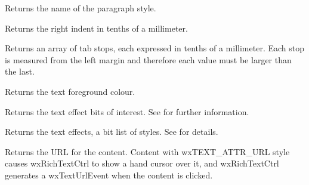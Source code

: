 \label{wxrichtextattrgetparagraphstylename}


Returns the name of the paragraph style.

\label{wxrichtextattrgetrightindent}


Returns the right indent in tenths of a millimeter.

\label{wxrichtextattrgettabs}


Returns an array of tab stops, each expressed in tenths of a millimeter. Each stop
is measured from the left margin and therefore each value must be larger than the last.

\label{wxrichtextattrgettextcolour}


Returns the text foreground colour.

\label{wxrichtextattrgettexteffectflags}


Returns the text effect bits of interest. See  for further information.

\label{wxrichtextattrgettexteffects}


Returns the text effects, a bit list of styles. See  for
details.

\label{wxrichtextattrgeturl}


Returns the URL for the content. Content with wxTEXT\_ATTR\_URL style
causes wxRichTextCtrl to show a hand cursor over it, and wxRichTextCtrl generates
a wxTextUrlEvent when the content is clicked.

\label{wxrichtextattrhasalignment}

